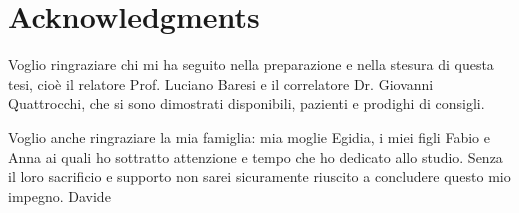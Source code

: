 
\bigskip

\begingroup
\let\clearpage\relax
\let\cleardoublepage\relax
\let\cleardoublepage\relax
\chapter*{Acknowledgments}
Voglio ringraziare chi mi ha seguito nella preparazione e nella stesura di questa tesi, cioè il relatore Prof. Luciano Baresi e il correlatore Dr. Giovanni Quattrocchi, che si sono dimostrati disponibili, pazienti e prodighi
di consigli. 

Voglio anche ringraziare la mia famiglia: mia moglie Egidia, i miei 
figli Fabio e Anna ai quali ho sottratto attenzione e tempo che ho dedicato
allo studio. Senza il loro sacrificio e supporto non sarei sicuramente
riuscito a concludere questo mio impegno. 
\flushright Davide

\endgroup